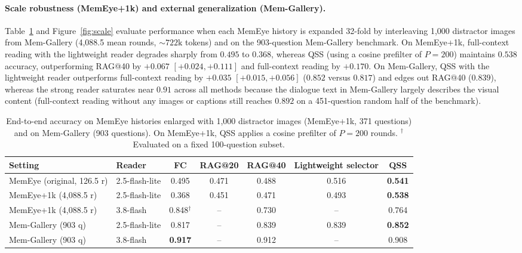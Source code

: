 \documentclass[10pt]{article}
\newcommand{\qss}{QSS}
\begin{document}
\paragraph{Scale robustness (MemEye+1k) and external generalization (Mem-Gallery).} Table~\ref{tab:robust} and Figure~\ref{fig:scale} evaluate performance when each MemEye history is expanded 32-fold by interleaving 1,000 distractor images from Mem-Gallery (4,088.5 mean rounds, $\sim 722\text{k}$ tokens) and on the 903-question Mem-Gallery benchmark. On MemEye+1k, full-context reading with the lightweight reader degrades sharply from $0.495$ to $0.368$, whereas \qss{} (using a cosine prefilter of $P{=}200$) maintains $0.538$ accuracy, outperforming RAG@40 by $+0.067$ $[+0.024, +0.111]$ and full-context reading by $+0.170$. On Mem-Gallery, \qss{} with the lightweight reader outperforms full-context reading by $+0.035$ $[+0.015, +0.056]$ ($0.852$ versus $0.817$) and edges out RAG@40 ($0.839$), whereas the strong reader saturates near $0.91$ across all methods because the dialogue text in Mem-Gallery largely describes the visual content (full-context reading without any images or captions still reaches $0.892$ on a 451-question random half of the benchmark).

\begin{table}[h]
\centering
\caption{End-to-end accuracy on MemEye histories enlarged with 1,000 distractor images (MemEye+1k, 371 questions) and on Mem-Gallery (903 questions). On MemEye+1k, \qss{} applies a cosine prefilter of $P{=}200$ rounds. $^\dagger$Evaluated on a fixed 100-question subset.}
\label{tab:robust}
\small
\begin{tabular}{llccccc}
\toprule
Setting & Reader & FC & RAG@20 & RAG@40 & Lightweight selector & \qss{} \\
\midrule
MemEye (original, 126.5 r) & 2.5-flash-lite & 0.495 & 0.471 & 0.488 & 0.516 & \textbf{0.541} \\
MemEye+1k (4,088.5 r) & 2.5-flash-lite & 0.368 & 0.451 & 0.471 & 0.493 & \textbf{0.538} \\
MemEye+1k (4,088.5 r) & 3.8-flash & 0.848$^\dagger$ & -- & 0.730 & -- & 0.764 \\
Mem-Gallery (903 q) & 2.5-flash-lite & 0.817 & -- & 0.839 & 0.839 & \textbf{0.852} \\
Mem-Gallery (903 q) & 3.8-flash & \textbf{0.917} & -- & 0.912 & -- & 0.908 \\
\bottomrule
\end{tabular}
\end{table}
\end{document}
